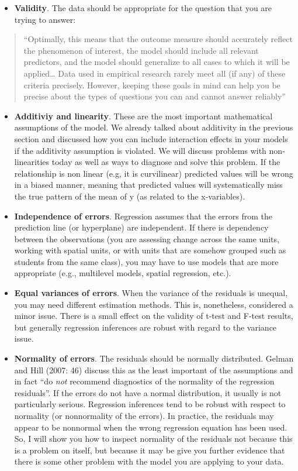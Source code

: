 \documentclass[
]{book}
\providecommand{\tightlist}{%
  \setlength{\itemsep}{0pt}\setlength{\parskip}{0pt}}
\begin{document}
\begin{itemize}
\tightlist
\item
  \textbf{Validity}. The data should be appropriate for the question that you are trying to answer:
\end{itemize}

\begin{quote}
``Optimally, this means that the outcome measure should accurately reflect the phenomenon of interest, the model should include all relevant predictors, and the model should generalize to all cases to which it will be applied\ldots{} Data used in empirical research rarely meet all (if any) of these criteria precisely. However, keeping these goals in mind can help you be precise about the types of questions you can and cannot answer reliably''
\end{quote}

\begin{itemize}
\item
  \textbf{Additiviy and linearity}. These are the most important mathematical assumptions of the model. We already talked about additivity in the previous section and discussed how you can include interaction effects in your models if the additivity assumption is violated. We will discuss problems with non-linearities today as well as ways to diagnose and solve this problem. If the relationship is non linear (e.g, it is curvilinear) predicted values will be wrong in a biased manner, meaning that predicted values will systematically miss the true pattern of the mean of y (as related to the x-variables).
\item
  \textbf{Independence of errors}. Regression assumes that the errors from the prediction line (or hyperplane) are independent. If there is dependency between the observations (you are assessing change across the same units, working with spatial units, or with units that are somehow grouped such as students from the same class), you may have to use models that are more appropriate (e.g., multilevel models, spatial regression, etc.).
\item
  \textbf{Equal variances of errors}. When the variance of the residuals is unequal, you may need different estimation methods. This is, nonetheless, considered a minor issue. There is a small effect on the validity of t-test and F-test results, but generally regression inferences are robust with regard to the variance issue.
\item
  \textbf{Normality of errors}. The residuals should be normally distributed. Gelman and Hill (2007: 46) discuss this as the least important of the assumptions and in fact ``do \emph{not} recommend diagnostics of the normality of the regression residuals''. If the errors do not have a normal distribution, it usually is not particularly serious. Regression inferences tend to be robust with respect to normality (or nonnormality of the errors). In practice, the residuals may appear to be nonnormal when the wrong regression equation has been used. So, I will show you how to inspect normality of the residuals not because this is a problem on itself, but because it may be give you further evidence that there is some other problem with the model you are applying to your data.
\end{itemize}
\end{document}
